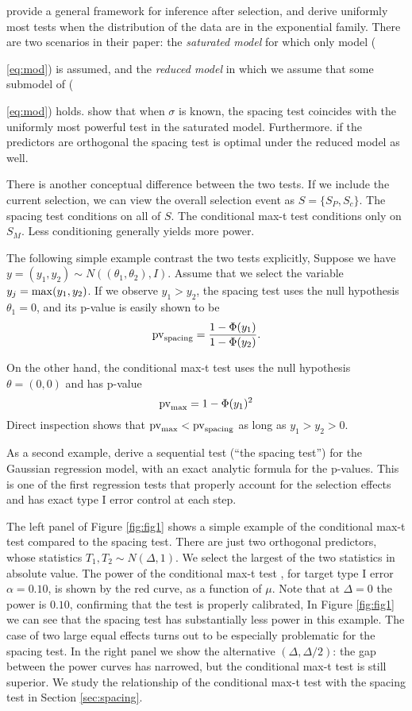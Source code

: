 \documentclass{article}
\begin{document}
\cite{FST2014} provide a general framework for inference after selection, and derive uniformly most tests  when the distribution of the data are in  the exponential family.
There are two scenarios in their paper: the {\em saturated model} for which only model ({\ref{eq:mod}) is assumed, and the {\em reduced model} in which we assume
that some submodel of ({\ref{eq:mod}) holds. \citet{FST2014} 
show that when $\sigma$ is known, the spacing test coincides with the uniformly most powerful test in the saturated model. Furthermore. if the predictors are orthogonal
the spacing test is optimal under the reduced model as well.

There is another conceptual difference between the two tests.
If we include the current selection, we can view the overall selection event as $S=\{S_P,S_c\}$. The spacing test conditions on all of $S$.
The conditional max-t test conditions only on $S_M$. Less conditioning  generally yields more power. 

The following simple example contrast the two tests explicitly,
Suppose we have $y=(y_1,y_2) \sim N((\theta_1,\theta_2), I)$.
Assume that we select the variable $y_j={\rm max}(y_1,y_2)$.
If we observe $y_1>y_2$, the spacing test  uses  the null hypothesis $\theta_1=0$, and its p-value is easily shown to be
\begin{equation}
{\rm pv}_{\rm spacing}=\frac{1-\Phi(y_1)}{1-\Phi(y_2)}.
\end{equation}

On the other hand, the conditional max-t test uses  the null hypothesis $\theta=(0,0)$ and has p-value
\begin{equation}
{\rm pv}_{\rm max}=1-\Phi(y_1)^2
\end{equation}
Direct inspection shows that ${\rm pv}_{\rm max} < {\rm pv}_{\rm spacing}$  as long as $y_1>y_2 > 0$.

As a second example, \citet{TLTT2014} derive a sequential test  (``the spacing test'') for the Gaussian regression model, with an exact analytic formula for the p-values. This is one of the first
regression tests that properly account for the selection effects and has exact type I error control at each step.

The left panel of Figure \ref{fig:fig1}  shows a simple example of the conditional max-t test compared to the spacing test.
 There are just two orthogonal predictors, whose statistics $T_1, T_2 \sim N(\Delta,1)$.
 We select the largest of the two statistics in absolute value. The power of the conditional max-t test , for target type I error $\alpha=0.10$, is shown by the red curve, as a function of $\mu$.
  Note that at $\Delta=0$ the power is $0.10$, confirming that the test is properly calibrated,
In Figure \ref{fig:fig1} we can see that the spacing test has substantially less power in this example.
The case of two large equal effects turns out to be especially problematic for the spacing test. In the right panel we show the alternative $(\Delta, \Delta/2)$:
the gap between the power curves has narrowed, but the conditional max-t test is still superior.
We study the relationship of the conditional max-t test with the spacing test in Section \ref{sec:spacing}.

}}
\end{document}
